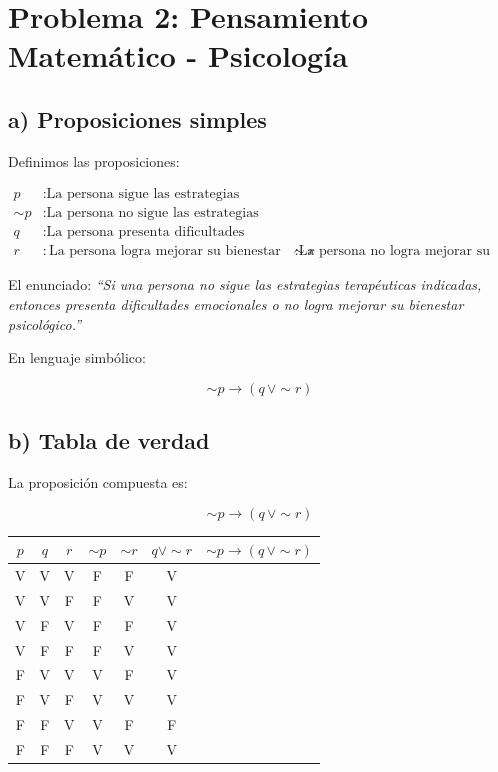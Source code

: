 \documentclass{article}
\begin{document}
	
	\section*{Problema 2: Pensamiento Matemático - Psicología}
	
	\subsection*{a) Proposiciones simples}
	
	Definimos las proposiciones:
	
	
	\[
	\begin{aligned}
		p &: \text{La persona sigue las estrategias terapéuticas indicadas.} \\
		\sim p &: \text{La persona no sigue las estrategias terapéuticas indicadas.} \\
		q &: \text{La persona presenta dificultades emocionales.} \\
		r &: \text{La persona logra mejorar su bienestar psicológico.}
		\sim r &: \text{La persona no logra mejorar su bienestar psicológico.}
	\end{aligned}
	\]
	
	
	
	El enunciado:  
	\textit{“Si una persona no sigue las estrategias terapéuticas indicadas, entonces presenta dificultades emocionales o no logra mejorar su bienestar psicológico.”}
	
	En lenguaje simbólico:
	
	
	\[
	\sim p \to (q \, \lor \sim r)
	\]
	
	
	
	\subsection*{b) Tabla de verdad}
	
	La proposición compuesta es:
	
	
	\[
	\sim p \to (q \, \lor \sim r)
	\]
	
	
	
	\begin{center}
		\begin{tabular}{|c|c|c|c|c|c|c|}
			\hline
			$p$ & $q$ & $r$ & $\sim p$ & $\sim r$ & $q \lor \sim r$ & $\sim p \to (q \, \lor  \sim r)$ \\
			\hline
			V & V & V & F & F & V \\
			V & V & F & F & V & V \\
			V & F & V & F & F & V \\
			V & F & F & F & V & V \\
			F & V & V & V & F & V \\
			F & V & F & V & V & V \\
			F & F & V & V & F & F \\
			F & F & F & V & V & V \\
			\hline
		\end{tabular}
	\end{center}
	
\end{document}
